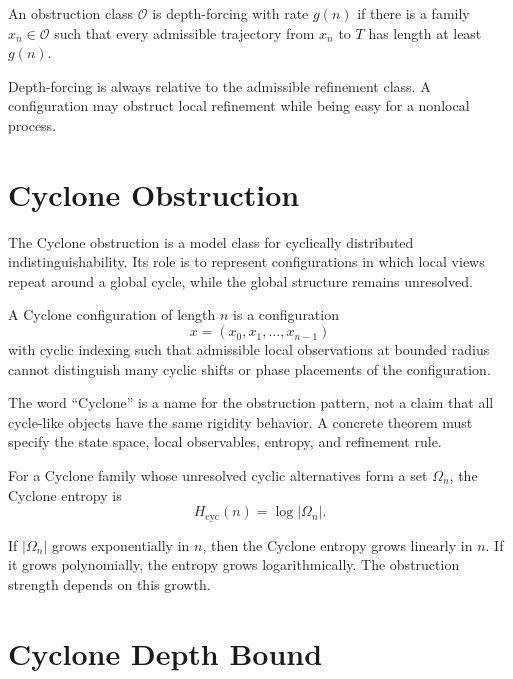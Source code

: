 \begin{definition}
An obstruction class \(\mathcal O\) is depth-forcing with rate \(g(n)\) if
there is a family \(x_n\in\mathcal O\) such that every admissible trajectory
from \(x_n\) to \(T\) has length at least \(g(n)\).
\end{definition}

Depth-forcing is always relative to the admissible refinement class. A
configuration may obstruct local refinement while being easy for a nonlocal
process.

\section{Cyclone Obstruction}

The Cyclone obstruction is a model class for cyclically distributed
indistinguishability. Its role is to represent configurations in which local
views repeat around a global cycle, while the global structure remains
unresolved.

\begin{definition}
A Cyclone configuration of length \(n\) is a configuration
\[
x=(x_0,x_1,\ldots,x_{n-1})
\]
with cyclic indexing such that admissible local observations at bounded radius
cannot distinguish many cyclic shifts or phase placements of the configuration.
\end{definition}

The word ``Cyclone'' is a name for the obstruction pattern, not a claim that
all cycle-like objects have the same rigidity behavior. A concrete theorem
must specify the state space, local observables, entropy, and refinement rule.

\begin{definition}
For a Cyclone family whose unresolved cyclic alternatives form a set
\(\Omega_n\), the Cyclone entropy is
\[
H_{\mathrm{cyc}}(n)=\log |\Omega_n|.
\]
\end{definition}

If \(|\Omega_n|\) grows exponentially in \(n\), then the Cyclone entropy grows
linearly in \(n\). If it grows polynomially, the entropy grows logarithmically.
The obstruction strength depends on this growth.

\section{Cyclone Depth Bound}


